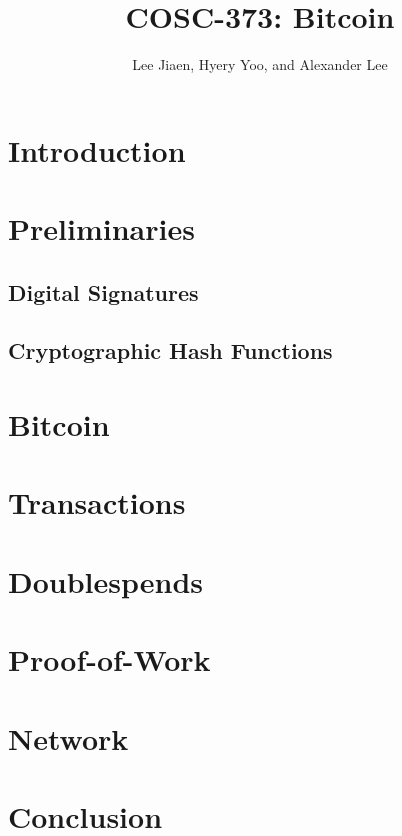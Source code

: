 \documentclass{article}
\title{COSC-373: Bitcoin}
\author{Lee Jiaen, Hyery Yoo, and Alexander Lee}
\begin{document}
\maketitle

\section{Introduction}

\section{Preliminaries}

\subsection{Digital Signatures}

\subsection{Cryptographic Hash Functions}

\section{Bitcoin}

\section{Transactions}

\section{Doublespends}

\section{Proof-of-Work}

\section{Network}

\section{Conclusion}
\end{document}
